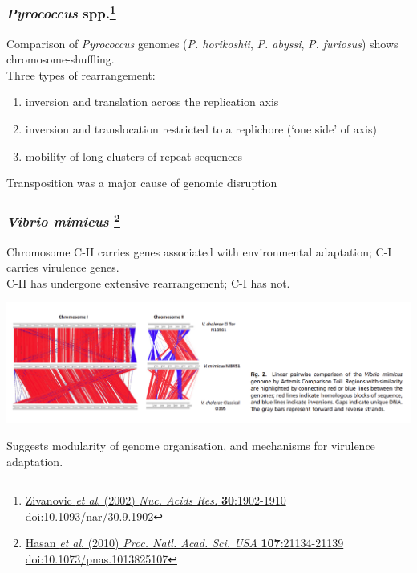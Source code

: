 \begin{frame}
  \frametitle{\textit{Pyrococcus} spp.\footnote{\tiny{\href{http://dx.doi.org/10.1093/nar/30.9.1902}{Zivanovic \textit{et al}. (2002) \textit{Nuc. Acids Res.} \textbf{30}:1902-1910 doi:10.1093/nar/30.9.1902}}}}
  Comparison of \textit{Pyrococcus} genomes (\textit{P. horikoshii}, \textit{P. abyssi}, \textit{P. furiosus}) shows chromosome-shuffling.\\[0.2cm]
  Three types of rearrangement:
  \begin{enumerate}
    \item inversion and translation across the replication axis
    \item inversion and translocation restricted to a replichore (`one side' of axis)
    \item mobility of long clusters of repeat sequences
  \end{enumerate}  
  Transposition was a major cause of genomic disruption  
\end{frame}

\begin{frame}
  \frametitle{\textit{Vibrio mimicus} \footnote{\tiny{\href{http://dx.doi.org/10.1073/pnas.1013825107}{Hasan \textit{et al}. (2010) \textit{Proc. Natl. Acad. Sci. USA} \textbf{107}:21134-21139 doi:10.1073/pnas.1013825107}}}}
  Chromosome C-II carries genes associated with environmental adaptation; C-I carries virulence genes.\\
  C-II has undergone extensive rearrangement; C-I has not.\\
  \begin{center}
    \includegraphics[width=1\textwidth]{images/v_mimicus}
  \end{center}    
  Suggests modularity of genome organisation, and mechanisms for virulence adaptation.
\end{frame}

